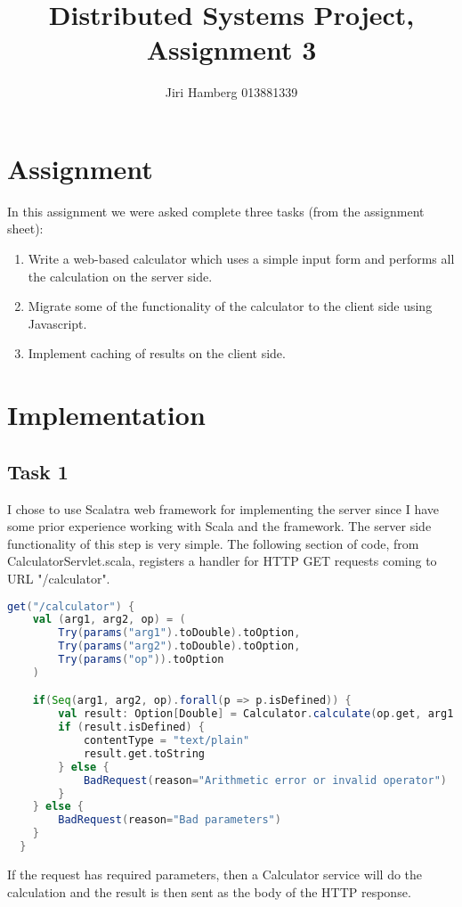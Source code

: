 \documentclass[12pt]{article}
\author{Jiri Hamberg 013881339}
\title{Distributed Systems Project, Assignment 3}
\begin{document}
\maketitle


\section{ Assignment }

In this assignment we were asked complete three tasks (from the assignment sheet):

\begin{enumerate}

	\item Write	 a	 web-based	 calculator	 which	 uses	 a	 simple	 input	 form	 and	
performs	all	the	calculation	on	the	server	side.
	\item Migrate	some	of	the	functionality	of	the	calculator	to	the	client	side	using	
Javascript.
	\item Implement	caching	of	results	on	the	client	side. 
\end{enumerate}

\section{ Implementation }

\subsection*{Task 1}

I chose to use Scalatra web framework for implementing the server since I have some prior experience working with Scala and the framework. The server side functionality of this step is very simple. The following section of code, from CalculatorServlet.scala, registers a handler for HTTP GET requests coming to URL "/calculator". 

\begin{lstlisting}[language=scala]
  get("/calculator") {
  	val (arg1, arg2, op) = (
  		Try(params("arg1").toDouble).toOption,
  		Try(params("arg2").toDouble).toOption,
  		Try(params("op")).toOption
	)

	if(Seq(arg1, arg2, op).forall(p => p.isDefined)) {
		val result: Option[Double] = Calculator.calculate(op.get, arg1.get, arg2.get)
		if (result.isDefined) {
			contentType = "text/plain"
			result.get.toString
		} else {
			BadRequest(reason="Arithmetic error or invalid operator")
		}
	} else {
		BadRequest(reason="Bad parameters")
	} 	
  }    
\end{lstlisting}

If the request has required parameters, then a Calculator service will do the calculation and the result is then sent as the body of the HTTP response. 
\end{document}
